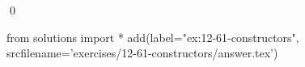 
\begin{ex}
  \label{ex:12-61-constructors}
  
  \qed
\end{ex}
\begin{python0}
from solutions import *
add(label="ex:12-61-constructors",
    srcfilename='exercises/12-61-constructors/answer.tex')
\end{python0}
